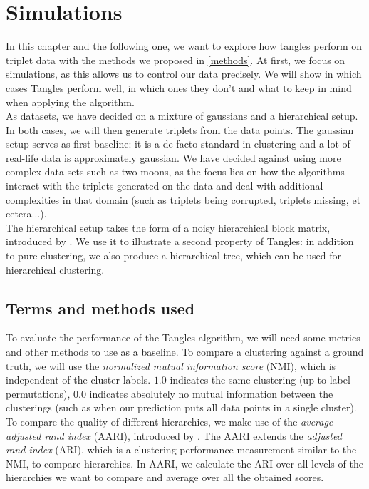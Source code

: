 \chapter{Simulations}\label{simulations}
In this chapter and the following one, we want to explore how tangles perform on triplet data with the methods we proposed in \autoref{methods}. 
At first, we focus on simulations, as this allows us to control our data precisely. 
We will show in which cases Tangles perform well, in which ones they don't and what to keep in mind when applying the algorithm. \\

As datasets, we have decided on a mixture of gaussians and a hierarchical setup. In both cases, we will then generate triplets from the data points.
The gaussian setup serves as first baseline: it is a de-facto standard in clustering and a lot of real-life data is approximately gaussian. 
We have decided against using more complex data sets such as two-moons, as the focus lies on how the algorithms
interact with the triplets generated on the data and deal with additional complexities in that domain (such as triplets being corrupted, triplets missing, et cetera...). \\

The hierarchical setup takes the form of a noisy hierarchical block matrix, introduced by \cite{balakrishnanNoiseThresholdsSpectral2011}.
We use it to illustrate a second property of Tangles: in addition to pure clustering, we also produce a hierarchical tree, 
which can be used for hierarchical clustering. 

\section{Terms and methods used}
To evaluate the performance of the Tangles algorithm, we will need some metrics and other methods to use as a baseline. To compare a clustering against a ground truth,
we will use the \textit{normalized mutual information score} (NMI), which is independent of the cluster labels. 
$1.0$ indicates the same clustering (up to label permutations), $0.0$ indicates absolutely no mutual information between the clusterings (such as when our prediction
puts all data points in a single cluster). To compare the quality of different hierarchies, we make use of the \textit{average adjusted rand index} (AARI), 
introduced by \cite{ghoshdastidarFoundationsComparisonBasedHierarchical2019}. The AARI extends the \textit{adjusted rand index} (ARI), which is a clustering performance measurement
similar to the NMI, to compare hierarchies. In AARI, we calculate the ARI over all levels of the hierarchies we want to compare and average over all the obtained scores. 


